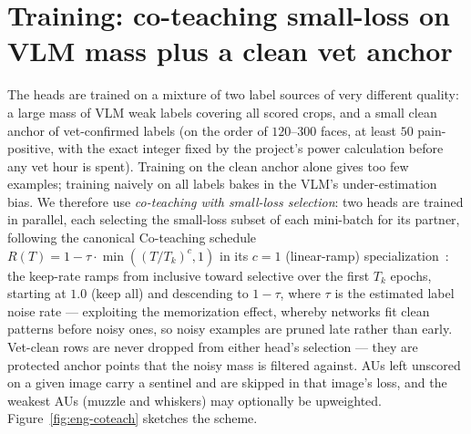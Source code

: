 \section{Training: co-teaching small-loss on VLM mass plus a clean vet anchor}
\label{sec:eng-training}

The heads are trained on a mixture of two label sources of very different
quality: a large mass of VLM weak labels covering all scored crops, and a small
clean anchor of vet-confirmed labels (on the order of $120$--$300$ faces, at
least $50$ pain-positive, with the exact integer fixed by the project's power
calculation before any vet hour is spent). Training on the clean anchor alone
gives too few examples; training naively on all labels bakes in the VLM's
under-estimation bias. We therefore use \emph{co-teaching with small-loss
selection}: two heads are trained in parallel, each selecting the small-loss
subset of each mini-batch for its partner, following the canonical Co-teaching
schedule $R(T)=1-\tau\cdot\min((T/T_k)^c,1)$ in its $c=1$ (linear-ramp)
specialization~\cite{han2018coteaching}: the keep-rate
ramps from inclusive toward selective over the first $T_k$ epochs, starting at
$1.0$ (keep all) and descending to $1-\tau$, where $\tau$ is the estimated label
noise rate --- exploiting the memorization effect, whereby networks fit clean
patterns before noisy ones, so noisy examples are pruned late rather than early.
Vet-clean rows are never
dropped from either head's selection --- they are protected anchor points that
the noisy mass is filtered against. AUs left unscored on a given image carry a
sentinel and are skipped in that image's loss, and the weakest AUs (muzzle and
whiskers) may optionally be upweighted. Figure~\ref{fig:eng-coteach} sketches the
scheme.

